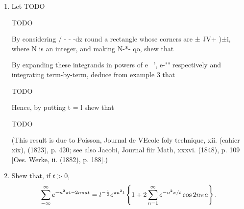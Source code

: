 \begin{enumerate}
\item
  Let TODO

  TODO

  By considering / - - -dz round a rectangle whose corners are ± JV+
  )±i, where N is an integer, and making N-*- qo, shew that

  By expanding these integrands in powers of e~ ', e-"" respectively
  and integrating term-by-term, deduce from example 3 that

  TODO

  Hence, by putting t = l shew that

  TODO

  (This result is due to Poisson, Journal de VEcole foly technique, xii.
  (cahier xix), (1823), p. 420; see also Jacobi, Journal fiir Math,
  xxxvi. (1848), p. 109 [Oes. Werke, ii. (1882), p. 188].) 

\item
  Shew that, if $t>0$,
  $$
  \sum_{-\infty}^{\infty}
  e^{-n^{2} \pi t - 2 n \pi a t}
  =
  t^{-\frac{1}{2}}
  e^{\pi a^{2} t}
  \left\{ 
    1
    +
    2
    \sum_{n=1}^{\infty}
    e^{-n^{2} \pi / t} \cos 2n\pi a
   \right\}.
  $$

\end{enumerate}